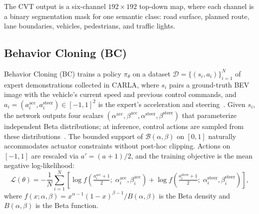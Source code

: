 \documentclass[12pt]{article}
\begin{document}
The CVT output is a six-channel $192{\times}192$ top-down map, where each channel is a binary segmentation mask for one semantic class: road surface, planned route, lane boundaries, vehicles, pedestrians, and traffic lights.


\subsection{Behavior Cloning (BC)}
\label{sec:bc}

Behavior Cloning (BC) trains a policy $\pi_\theta$ on a dataset $\mathcal{D} = \{(s_i, a_i)\}_{i=1}^N$ of expert demonstrations collected in CARLA, where $s_i$ pairs a ground-truth BEV image with the vehicle's current speed and previous control commands, and $a_i = (a_i^{\mathrm{acc}}, a_i^{\mathrm{steer}}) \in [-1,1]^2$ is the expert's acceleration and steering~\cite{pomerleau1988alvinn}. Given $s_i$, the network outputs four scalars $(\alpha^{\mathrm{acc}}, \beta^{\mathrm{acc}}, \alpha^{\mathrm{steer}}, \beta^{\mathrm{steer}})$ that parameterize independent Beta distributions; at inference, control actions are sampled from these distributions~\cite{Petrazzini2021,antonelo2024investigating}. The bounded support of $\mathcal{B}(\alpha,\beta)$ on $[0,1]$ naturally accommodates actuator constraints without post-hoc clipping. Actions on $[-1,1]$ are rescaled via $a' = (a+1)/2$, and the training objective is the mean negative log-likelihood:
\begin{equation}
  \mathcal{L}(\theta)
  = -\frac{1}{N}\sum_{i=1}^{N}
    \left[
      \log f\!\left(\tfrac{a_i^{\mathrm{acc}}+1}{2};\;
                    \alpha_i^{\mathrm{acc}},\beta_i^{\mathrm{acc}}\right)
      +
      \log f\!\left(\tfrac{a_i^{\mathrm{steer}}+1}{2};\;
                    \alpha_i^{\mathrm{steer}},\beta_i^{\mathrm{steer}}\right)
    \right],
  \label{eq:bcloss_car}
\end{equation}
where $f(x;\alpha,\beta) = x^{\alpha-1}(1-x)^{\beta-1}/B(\alpha,\beta)$ is the Beta density and $B(\alpha,\beta)$ is the Beta function.
\end{document}
